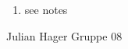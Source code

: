 \begin{enumerate}[label={T\arabic*},start=38]
	\item see notes
\end{enumerate}

Julian Hager
Gruppe 08